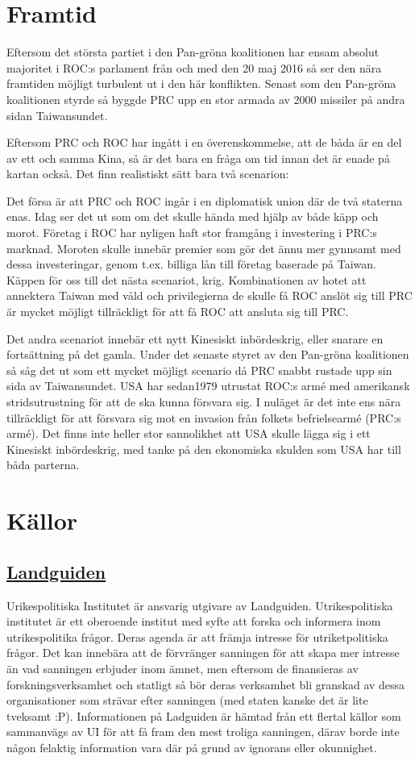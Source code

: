 \documentclass[a4paper,10pt]{article}
\begin{document}
\section*{Framtid}
Eftersom det största partiet i den Pan-gröna koalitionen har ensam absolut majoritet i ROC:s parlament från och med den 20 maj 2016 så ser den nära framtiden möjligt turbulent ut i den här konflikten. Senast som den Pan-gröna koalitionen styrde så byggde PRC upp en stor armada av 2000 missiler på andra sidan Taiwansundet.

Eftersom PRC och ROC har ingått i en överenskommelse, att de båda är en del av ett och samma Kina, så är det bara en fråga om tid innan det är enade på kartan också. Det finn realistiskt sätt bara två scenarion:

Det försa är att PRC och ROC ingår i en diplomatisk union där de två staterna enas. Idag ser det ut som om det skulle hända med hjälp av både käpp och morot. Företag i ROC har nyligen haft stor framgång i investering i PRC:s marknad. Moroten skulle innebär premier som gör det ännu mer gynnsamt med dessa investeringar, genom t.ex. billiga lån till företag baserade på Taiwan. Käppen för oss till det nästa scenariot, krig. Kombinationen av hotet att annektera Taiwan med våld och privilegierna de skulle få ROC anslöt sig till PRC är mycket möjligt tillräckligt för att få ROC att ansluta sig till PRC.

Det andra scenariot innebär ett nytt Kinesiskt inbördeskrig, eller snarare en fortsättning på det gamla. Under det senaste styret av den Pan-gröna koalitionen så såg det ut som ett mycket möjligt scenario då PRC snabbt rustade upp sin sida av Taiwansundet. USA har sedan1979 utrustat ROC:s armé med amerikansk stridsutrustning för att de ska kunna försvara sig. I nuläget är det inte ens nära tillräckligt för att försvara sig mot en invasion från folkets befrielsearmé (PRC:s armé). Det finns inte heller stor sannolikhet att USA skulle lägga sig i ett Kinesiskt inbördeskrig, med tanke på den ekonomiska skulden som USA har till båda parterna.

\section*{Källor}
\subsection*{\href{https://www.landguiden.se/Lander/Asien/Taiwan}{Landguiden}}
Urikespolitiska Institutet är ansvarig utgivare av Landguiden. Utrikespolitiska institutet är ett oberoende institut med syfte att forska och informera inom utrikespolitika frågor. Deras agenda är att främja intresse för utriketpolitiska frågor. Det kan innebära att de förvränger sanningen för att skapa mer intresse än vad sanningen erbjuder inom ämnet, men eftersom de finansieras av forskningsverksamhet och statligt så bör deras verksamhet bli granskad av dessa organisationer som strävar efter sanningen (med staten kanske det är lite tveksamt :P). Informationen på Ladguiden är hämtad från ett flertal källor som sammanvägs av UI för att få fram den mest troliga sanningen, därav borde inte någon felaktig information vara där på grund av ignorans eller okunnighet. 
\end{document}
